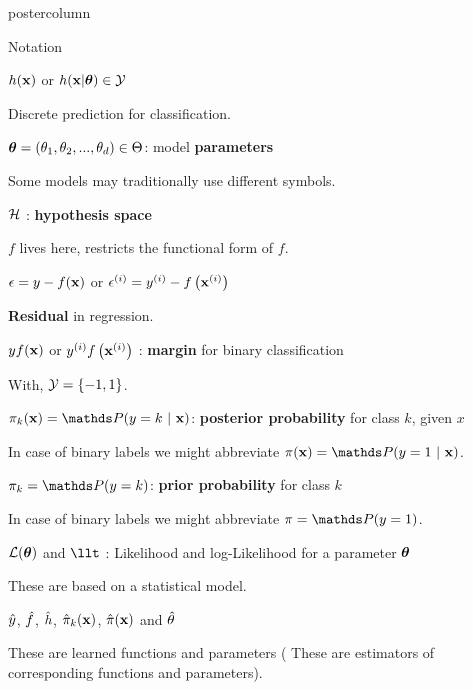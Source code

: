 \documentclass{beamer}
\begin{document}
\begin{frame}[fragile]{}
\begin{columns}
\begin{column}{.31\textwidth}
\begin{beamercolorbox}[center]{postercolumn}
\begin{minipage}{.98\textwidth}
{\begin{myblock}{Notation}
						
							 $h(\mathbf{x})$ or $h(\mathbf{x} | \bm{\theta}) \in \mathcal{Y}$
						
						\hspace*{1ex}Discrete prediction for classification.
						
						
							$\bm{\theta} = (\theta_1, \theta_2, ..., \theta_d) \in \Theta$: 
							model \textbf{parameters}
						
						\hspace*{1ex}Some models may traditionally use different symbols.
						
						
							$\mathcal{H}$ : \textbf{hypothesis space}
						
						\hspace*{1ex}$f$ lives here, restricts the functional form of $f$.
						
						
				            $\epsilon = y - f(\mathbf{x})$ or $\epsilon^{(i)} = y^{(i)} - f\left(\mathbf{x}^{(i)}\right)$
						
						\hspace*{1ex}\textbf{Residual} in regression.
						
						
				             $y f(\mathbf{x})$ or $y^{(i)} f\left(\mathbf{x}^{(i)}\right)$ : \textbf{margin} for binary classification
						
						\hspace*{1ex}With, $\mathcal{Y} = \{-1, 1\}$.
						
						 $\pikx = \postk$: \textbf{posterior probability} for class $k$, given $x$
						
						\hspace*{1ex}In case of binary labels we might abbreviate $\pix = \post$.
						
						
						$\pi_k = \P(y = k)$:\textbf{ prior probability} for class $k$
						
						\hspace*{1ex}In case of binary labels we might abbreviate $\pi = \P(y = 1)$.
						
						
						$\mathcal{L}(\bm{\theta})$ and $\llt$ : Likelihood and log-Likelihood for a parameter $\bm{\theta}$
						
						\hspace*{1ex}These are based on a statistical model.
						
						
						 $\hat{y}$, $\hat{f}$, $\hat{h}$, $\hat \pi_{k}(\mathbf{x})$, $\hat \pi(\mathbf{x})$ and $\hat{\theta}$
						
						\hspace*{1ex}These are learned functions and parameters ( These are estimators of \hspace*{1ex}corresponding functions and parameters).\\
		

\end{myblock}}
\end{minipage}
\end{beamercolorbox}
\end{column}
\end{columns}
\end{frame}
\end{document}
